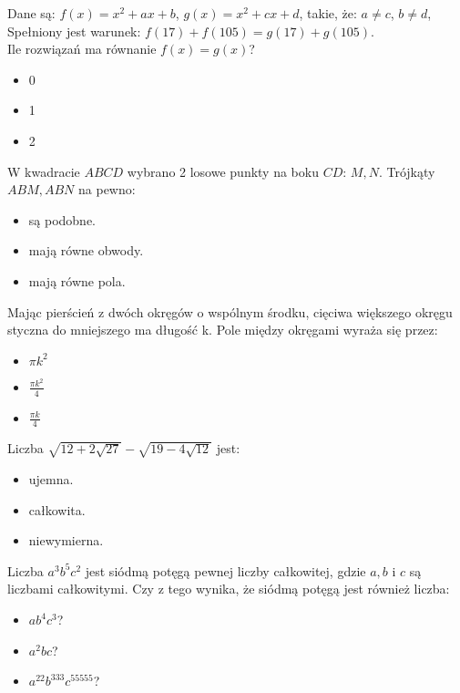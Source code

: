 \documentclass[12pt, a4paper]{article}
\newcommand{\question}[1]{\normalitem \begin{samepage}#1 \end{samepage}}
\newcommand{\questionwithasterix}[1]{ \asterixitem \begin{samepage}#1 \vspace{6cm}\end{samepage}}
\newcommand{\cmark}{\textcolor{green}{T}}%
\newcommand{\xmark}{\textcolor{red}{N}}%
\newcommand{\yes}{\rlap{\framebox(15,15)} {\raisebox{2pt}{\large\hspace{-1pt}\cmark}}%
\hspace{3pt}}
\newcommand{\no}{\rlap{\framebox(15,15)} {\raisebox{2pt}{\large\hspace{-1pt}\xmark}}%
\hspace{3pt}}
\begin{document}
\begin{enumerate}
	\question {
	    Dane są: $f(x) = x^2 + ax + b$, $g(x) = x^2 + cx + d$, takie, że: $a \neq c$, $b \neq d$, \\
	    Spełniony jest warunek: $f(17)+f(105) = g(17) + g(105)$. \\
	    Ile rozwiązań ma równanie $f(x) = g(x)$?
	    
	    \begin{itemize}
	        \item [\no]0
	        \item [\yes]1
	        \item [\no]2
	    \end{itemize}
	}
	
	\question {
	    W kwadracie $ABCD$ wybrano 2 losowe punkty na boku $CD$: $M, N$.
	    Trójkąty $ABM, ABN$ na pewno:
	    
	    \begin{itemize}
	        \item [\no]są podobne.
	        \item [\no]mają równe obwody.
	        \item [\yes]mają równe pola.
	    \end{itemize}
    }
    
	\question {
	    Mając pierścień z dwóch okręgów o wspólnym środku, cięciwa większego okręgu styczna do mniejszego ma długość k. Pole między okręgami wyraża się przez:
	    
	    \begin{itemize}
	        \item [\no]$\pi k^2$
	        \item [\yes]$\frac{\pi k^2}{4}$
	        \item [\no]$\frac{\pi k}{4}$
	    \end{itemize}
	}
	
	\questionwithasterix {
		Liczba $\sqrt{12+2 \sqrt{27}}-\sqrt{19-4\sqrt{12}}$ jest:
		
		\begin{itemize}
			\item [\no]ujemna.
			\item [\no]całkowita.
			\item [\yes]niewymierna.
		\end{itemize}
	}
	
	\question{
	    Liczba $a^3b^5c^2$ jest siódmą potęgą pewnej liczby całkowitej, gdzie $a,b$ i $c$ są liczbami całkowitymi. Czy z tego wynika, że siódmą potęgą jest również liczba:
	    
	    \begin{itemize}
	        \item [\yes]$ab^4c^3$?
	        \item [\no]$a^2bc$?
	        \item [\yes]$a^{22}b^{333}c^{55555}$?
	    \end{itemize}
	}
	

\end{enumerate}
\end{document}
